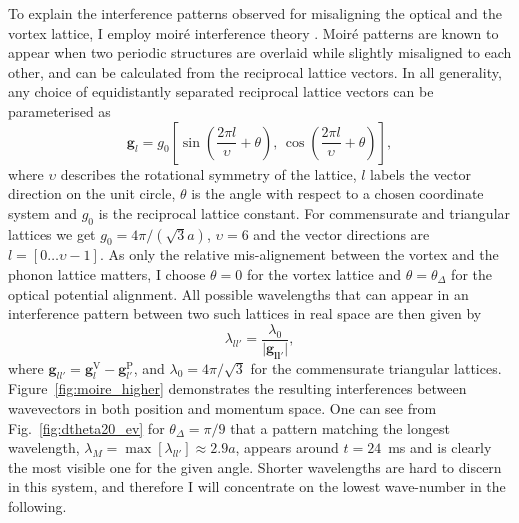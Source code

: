     To explain the interference patterns observed for misaligning the optical and the vortex lattice, I employ moir\'e interference theory \cite{SS:Hermann_jpcm_2012}. Moir\'e patterns are known to appear when two periodic structures are overlaid while slightly misaligned to each other, and can be calculated from the reciprocal lattice vectors. In all generality, any choice of equidistantly separated reciprocal lattice vectors can be parameterised as
    	\begin{equation}
    		\mathbf{g}_{l} = g_0 \left[ \sin\left( \frac{2\pi l}{\upsilon}+\theta \right),\, \cos\left( \frac{2\pi l}{\upsilon} +\theta\right) \right],
    	\end{equation}
    where $\upsilon$ describes the rotational symmetry of the lattice, $l$ labels the vector direction on the unit circle, $\theta$ is the angle with respect to a chosen coordinate system and $g_0$ is the reciprocal lattice constant. For commensurate and triangular lattices we get $g_0=4\pi/(\sqrt{3}a)$, $\upsilon=6$ and the vector directions are $l=\left[0\dots\upsilon-1\right]$. As only the relative mis-alignement between the vortex and the phonon lattice matters, I choose $\theta=0$ for the vortex lattice and $\theta=\theta_\Delta$ for the optical potential alignment.
    All possible wavelengths that can appear in an interference pattern between two such lattices in real space are then given by
    	\begin{equation}
    		\lambda_{ll'} = \frac{\lambda_0}{|\mathbf{\mathbf{g}_{ll'}|}},
    		\label{eq:InterferenceVectors}
    	\end{equation}
    where
    $\mathbf{g}_{ll'}=\mathbf{g}_{l}^{\text{V}}-\mathbf{g}_{l'}^{\text{P}}$, and
    $\lambda_0 = 4\pi/\sqrt{3}$ for the commensurate triangular lattices. Figure~\ref{fig:moire_higher} demonstrates the resulting interferences between wavevectors in both position and momentum space. One can see from Fig.~\ref{fig:dtheta20_ev} for $\theta_\Delta = \pi/9$ that a pattern matching the longest wavelength, $\lambda_M= \max[\lambda_{ll'}] \approx 2.9 a$, appears around $t=24$~ms and is clearly the most visible one for the given angle. Shorter wavelengths are hard to discern in this system, and therefore I will concentrate on the lowest wave-number in the following.

